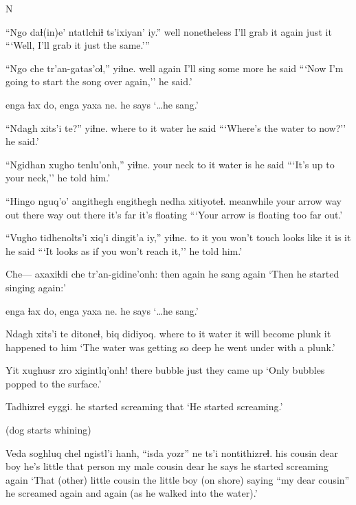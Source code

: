 \documentclass[12pt]{article}
\begin{document}
N

\gll ``Ngo daɬ(in)e' ntatlchiɬ ts'ixiyan' iy.'' 
well nonetheless {I'll grab it again} just it
\glt ```Well, I'll grab it just the same.'''
\glend

\gll ``Ngo che tr'an-gatas'oɬ,'' yiɬne. 
well again {I'll sing some more} {he said}
\glt ```Now I'm going to start the song over again,'' he said.'
\glend

 {enga ɬax do,} {enga yaxa} ne.
{} {} {} {he says}
\glt `\ldots he sang.' 
\glend

\gll ``Ndagh xits'i te?'' yiɬne. 
where {to it} water {he said}
\glt ```Where's the water to now?'' he said.' 
\glend

\gll ``Ngidhan xugho tenlu'onh,'' yiɬne. 
{your neck} {to it} {water is} {he said}
\glt ```It's up to your neck,'' he told him.' 
\glend

\gll ``Hingo nguq'o' angithegh engithegh nedha xitiyoteɬ.
meanwhile {your arrow} {way out there} {way out there} {it's far} {it's floating}
\glt ```Your arrow is floating too far out.' 
\glend

\gll ``Vugho tidhenolts'i xiq'i dingit'a iy,'' yiɬne. 
{to it} {you won't touch} {looks like} {it is} it {he said}
\glt ```It looks as if you won't reach it,'' he told him.' 
\glend

\gll Che--- axaxiɬdi che tr'an-gidine'onh: 
{} then again {he sang again}
\glt `Then he started singing again:'
\glend

 {enga ɬax do,} {enga yaxa} ne.
{} {} {} {he says}
\glt `\ldots he sang.' 
\glend

\gll Ndagh xits'i te ditoneɬ, biq didiyoq. 
where {to it} water {it will become} plunk {it happened to him}
\glt `The water was getting so deep he went under with a plunk.' 
\glend

\gll Yit xughusr zro xigintlq'onh! 
there bubble just {they came up}
\glt `Only bubbles popped to the surface.'
\glend

\gll Tadhizreɬ eyggi. 
{he started screaming} that
\glt `He started screaming.' 
\glend

(dog starts whining)

\gll Veda soghluq chel ngistl'i hanh, ``isda yozr'' ne ts'i nontithizreɬ. 
{his cousin} dear boy {he's little} {that person} {my male cousin} dear {he says} {} {he started screaming again}
\glt `That (other) little cousin the little boy (on shore) saying ``my dear cousin'' he screamed again and again (as he walked into the water).'
\glend
\end{document}
